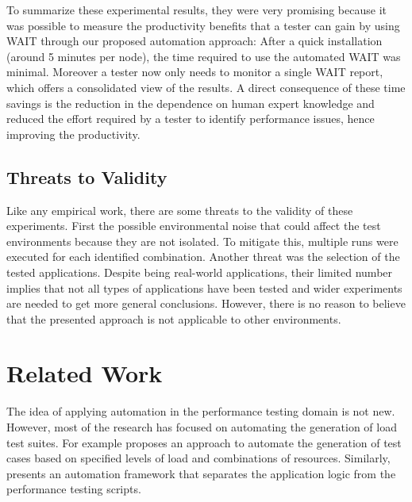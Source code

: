 \documentclass[runningheads,a4paper]{llncs}
\begin{document}
To summarize these experimental results, they were very promising because it
was possible to measure the productivity benefits that a tester can gain by using
WAIT through our proposed automation approach: After a quick installation
(around 5 minutes per node), the time required to use the automated WAIT was
minimal. Moreover a tester now only needs to monitor a single WAIT report, which
offers a consolidated view of the results. A direct consequence of these
time savings is the reduction in the dependence on human expert knowledge and
reduced the effort required by a tester to identify performance issues, hence
improving the productivity.

\vspace{-7pt}
\subsection{Threats to Validity}
\vspace{-7pt}
Like any empirical work, there are some threats to the validity of these
experiments. First the possible environmental noise that could affect the test
environments because they are not isolated. To mitigate this, multiple runs were
executed for each identified combination. Another threat was the selection of
the tested applications. Despite being real-world applications, their limited
number implies that not all types of applications have been tested and wider
experiments are needed to get more general conclusions. However, there is no
reason to believe that the presented approach is not applicable to other
environments.

\vspace{-7pt}
\section{Related Work}
\label{RelatedWork}
\vspace{-7pt}

The idea of applying automation in the performance testing domain is not new.
However, most of the research has focused on automating the generation of load
test
suites\cite{Elvira1,Bayan1,Zhang1,Briand1,Avritzer2,Avritzer3,Chen1,Garousi1}.
For example \cite{Bayan1} proposes an approach to automate the generation of test 
cases based on specified levels of load and combinations of resources.
Similarly, \cite{Chen1} presents an automation framework that separates the
application logic from the performance testing scripts.
\end{document}
